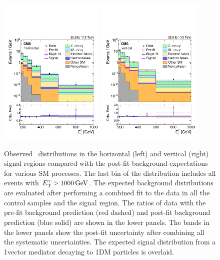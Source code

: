 \begin{figure}[htbp]
  \centering
    \includegraphics[width=0.45\textwidth]{Analysis/Figures/bonly_horizontal.pdf}
    \includegraphics[width=0.45\textwidth]{Analysis/Figures/bonly_vertical.pdf}
    \caption{
      Observed \ETg\ distributions in the horizontal (left) and vertical (right) signal regions compared with the post-fit background expectations for various SM processes.
      The last bin of the distribution includes all events with $E_{\mathrm{T}}^{\gamma} > 1000\,\text{Ge\hspace{-.08em}V}$. 
      The expected background distributions are evaluated after performing a combined fit to the data in all the control samples and the signal region. 
      The ratios of data with the pre-fit background prediction (red dashed) and post-fit background prediction (blue solid) are shown in the lower panels. 
      The bands in the lower panels show the post-fit uncertainty after combining all the systematic uncertainties. 
      The expected signal distribution from a 1\TeV vector mediator decaying to 1\GeV DM particles is overlaid.
    }
    \label{fig:postfitSR}
\end{figure}

